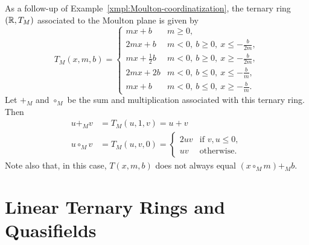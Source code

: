 

\begin{xmpl}\label{xmpl:Moulton-ternary-ring-defn}
    As a follow-up of Example~\ref{xmpl:Moulton-coordinatization}, the ternary ring $(\mathbb{R},T_M)$ associated to the Moulton plane is given by
    \[
        T_M(x,m,b) =
            \begin{cases}
                mx+b        &m\ge0,\\[1mm]
                2mx+b     &m<0,\ b\ge0,\ x\le-\frac b{2m},\\[1mm]
                mx+\frac12b   &m<0,\ b\ge0,\ x\ge-\frac b{2m},\\[1mm]
                2mx+2b    &m<0,\ b\le0,\ x\le-\frac bm,\\[1mm]
                mx+b      &m<0,\ b\le0,\ x\ge-\frac bm.
            \end{cases}
    \]
    Let $+_M$ and $\circ_M$ be the sum and multiplication associated with this ternary ring. Then
    \begin{align*}
        u+_Mv &= T_M(u,1,v)= u + v\\
        u\circ_Mv &= T_M(u,v,0)
        = \begin{cases}
            2uv     &\text{if }v,u\le0,\\
            uv      &\text{otherwise}.
        \end{cases}
    \end{align*}
    Note also that, in this case, $T(x,m,b)$ does not always equal $(x\circ_Mm)+_Mb$.
\end{xmpl}


\section{Linear Ternary Rings and Quasifields}

